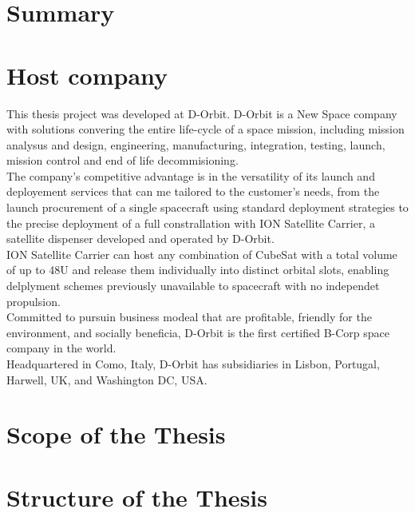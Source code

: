 \emph{}

\section*{Summary}

\section*{Host company}
This thesis project was developed at D-Orbit.
D-Orbit is a New Space company with solutions convering the entire life-cycle of a space mission, including mission analysus and design, engineering, manufacturing, integration, testing, launch, mission control and end of life decommisioning.\\
The company's competitive advantage is in the versatility of its launch and deployement services that can me tailored to the customer's needs, from the launch procurement of a single spacecraft using standard deployment strategies to the precise deployment of a full constrallation with ION Satellite Carrier, a satellite dispenser developed and operated by D-Orbit.\\
ION Satellite Carrier can host any combination of CubeSat with a total volume of up to 48U and release them individually into distinct orbital slots, enabling delplyment schemes previously unavailable to spacecraft with no independet propulsion.\\
Committed to pursuin business modeal that are profitable, friendly for the environment, and socially beneficia, D-Orbit is the first certified B-Corp space company in the world.\\
Headquartered in Como, Italy, D-Orbit has subsidiaries in Lisbon, Portugal, Harwell, UK, and Washington DC, USA.\\

\section*{Scope of the Thesis}

\section*{Structure of the Thesis}

